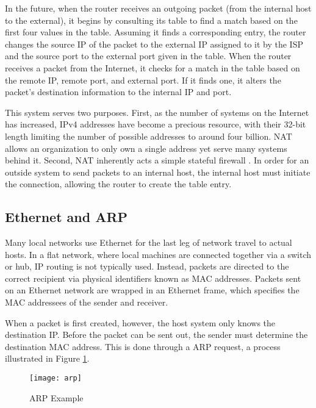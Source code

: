 \par In the future, when the router receives an outgoing packet (from the internal host to the external), it begins by consulting its table to find a match based on the first four values in the table. Assuming it finds a corresponding entry, the router changes the source IP of the packet to the external IP assigned to it by the \ac{ISP} and the source port to the external port given in the table. When the router receives a packet from the Internet, it checks for a match in the table based on the remote IP, remote port, and external port. If it finds one, it alters the packet's destination information to the internal IP and port.

\par This system serves two purposes. First, as the number of systems on the Internet has increased, \ac{IPv4} addresses have become a precious resource, with their 32-bit length limiting the number of possible addresses to around four billion. \ac{NAT} allows an organization to only own a single address yet serve many systems behind it. Second, \ac{NAT} inherently acts a simple stateful firewall \cite{DynAddrMalProp}. In order for an outside system to send packets to an internal host, the internal host must initiate the connection, allowing the router to create the table entry.

\subsection{Ethernet and \acf{ARP}}
\label{sec:eth_routing}
\par Many local networks use Ethernet for the last leg of network travel to actual hosts. In a flat network, where local machines are connected together via a switch or hub, \ac{IP} routing is not typically used. Instead, packets are directed to the correct recipient via physical identifiers known as \ac{MAC} addresses. Packets sent on an Ethernet network are wrapped in an Ethernet frame, which specifies the \ac{MAC} addressees of the sender and receiver.

\par When a packet is first created, however, the host system only knows the destination \ac{IP}. Before the packet can be sent out, the sender must determine the destination \ac{MAC} address. This is done through a \ac{ARP} request, a process illustrated in Figure \ref{fig:arp_example}.

\begin{figure}[ht]
\caption{\ac{ARP} Example}
\label{fig:arp_example}
\centering
\texttt{[image: arp]}
\end{figure}

